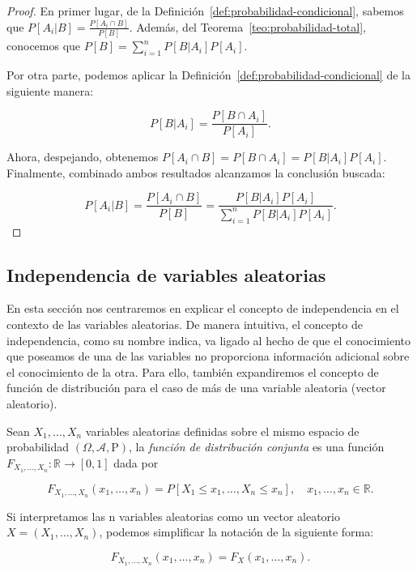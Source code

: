 \begin{proof}
    En primer lugar, de la Definición~\ref{def:probabilidad-condicional}, sabemos que
     $P[A_i|B] = \frac{P[A_i \cap B]}{P[B]}$. Además, del Teorema~\ref{teo:probabilidad-total}, conocemos que $P[B] = \sum_{i=1}^n P[B|A_i]P[A_i]$.\newline

    Por otra parte, podemos aplicar la Definición~\ref{def:probabilidad-condicional} de la siguiente manera:

    \[ P[B|A_i] = \frac{P[B \cap A_i]}{P[A_i]}. \]\newline

    Ahora, despejando, obtenemos $P[A_i \cap B] = P[B \cap A_i] = P[B|A_i]{P[A_i]}$. Finalmente, combinado ambos resultados alcanzamos la conclusión buscada:

    \[ P[A_i|B] = \frac{P[A_i \cap B]}{P[B]} = \frac{P[B | A_i]P[A_i]}{\sum_{i=1}^n P[B|A_i]P[A_i]}. \]
    
\end{proof}

\subsection{Independencia de variables aleatorias}

En esta sección nos centraremos en explicar el concepto de independencia en el contexto de las variables aleatorias. De manera intuitiva, el concepto de independencia, como su nombre indica, va ligado al hecho de que el conocimiento que poseamos de una de las variables no proporciona información adicional sobre el conocimiento de la otra. Para ello, también expandiremos el concepto de función de distribución para el caso de más de una variable aleatoria (vector aleatorio).\newline

\begin{definicion}\label{def:funcion-de-distribucion-conjunta}
    Sean $X_1, \ldots, X_n$ variables aleatorias definidas sobre el mismo espacio de probabilidad $(\Omega, \mathcal{A}, \mathrm{P})$, la \emph{función de distribución conjunta} es una función $F_{X_{1}, \ldots, X_{n}}: \mathbb{R} \to [0,1]$ dada por

    \[ F_{X_{1}, \ldots, X_{n}}(x_1, \ldots, x_n) = P[X_1 \leq x_1, \ldots, X_n \leq x_n], \quad x_1, \ldots, x_n \in \mathbb{R}. \]

    Si interpretamos las n variables aleatorias como un vector aleatorio $X = (X_1, \ldots, X_n)$, podemos simplificar la notación de la siguiente forma:

    \[ F_{X_{1}, \ldots, X_{n}}(x_1, \ldots, x_n) = F_X(x_1, \ldots, x_n). \]\newline
\end{definicion}

